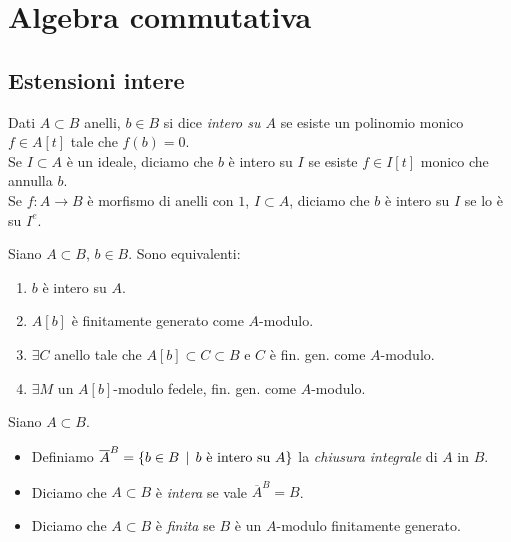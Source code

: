 \chapter{Algebra commutativa}

\section{Estensioni intere}
\begin{definition}
 Dati $A\subset B$ anelli, $b\in B$ si dice \emph{intero su $A$} se esiste un polinomio monico $f\in A[t]$ tale che $f(b)=0$.\\
 Se $I\subset A$ è un ideale, diciamo che $b$ è intero su $I$ se esiste $f\in I[t]$ monico che annulla $b$.\\
 Se $f:A\to B$ è morfismo di anelli con $1$, $I\subset A$, diciamo che $b$ è intero su $I$ se lo è su $I^e$.
\end{definition}

\begin{proposition}
    Siano $A\subset B$, $b\in B$. Sono equivalenti:
    \begin{enumerate}
        \item $b$ è intero su $A$.
        \item $A[b]$ è finitamente generato come $A$-modulo.
        \item $\exists C$ anello tale che $A[b]\subset C \subset B$ e $C$ è fin. gen. come $A$-modulo.
        \item $\exists M$ un $A[b]$-modulo fedele, fin. gen. come $A$-modulo.
    \end{enumerate}
\end{proposition}

\begin{definition}
    Siano $A\subset B$.
    \begin{itemize}
        \item Definiamo $\overline{A}^B=\{ b\in B \operatorname{\; |\;} b \text{ è intero su } A \}$ la \emph{chiusura integrale} di $A$ in $B$.
        \item Diciamo che $A\subset B$ è \emph{intera} se vale $\overline{A}^B = B$.
        \item Diciamo che $A\subset B$ è \emph{finita} se $B$ è un $A$-modulo finitamente generato.
    \end{itemize}
\end{definition}

